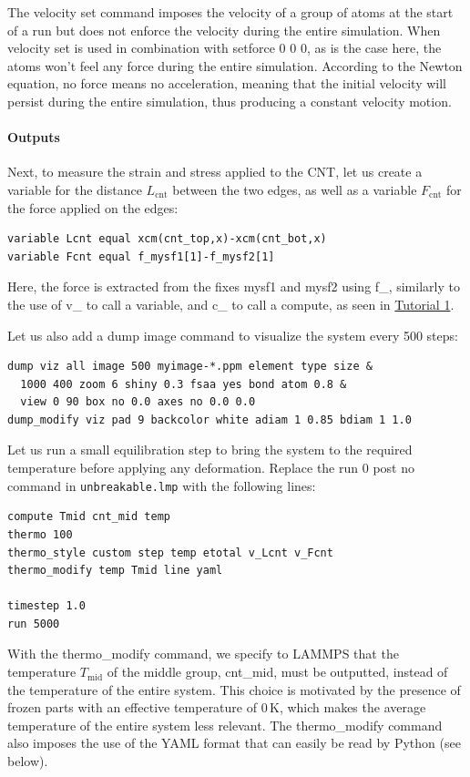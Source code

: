 \documentclass[9pt,tutorial]{livecoms}
\newcommand{\lmpcmd}[1]{\hspace{0pt}\colorbox{listing}{\textcolor{command}{\small{#1}}}\hspace{0pt}} %
\newcommand{\lmpcmdnote}[1]{\hspace{0pt}\colorbox{note_listing}{\textcolor{command}{\small{#1}}}\hspace{0pt}} %
\newcommand{\flecmd}[1]{\textcolor{command}{\texttt{#1}}} %
\begin{document}
\begin{note}
The \lmpcmdnote{velocity set}
command imposes the velocity of a group of atoms at the start of a run but does
not enforce the velocity during the entire simulation.  When \lmpcmdnote{velocity set}
is used in combination with \lmpcmdnote{setforce 0 0 0}, as is the case here, the
atoms won't feel any force during the entire simulation.  According to the Newton
equation, no force means no acceleration, meaning that the initial velocity
will persist during the entire simulation, thus producing a constant velocity motion.
\end{note}

\paragraph{Outputs}

Next, to measure the strain and stress applied to the CNT, let us create a
variable for the distance $L_\text{cnt}$ between the two edges,
as well as a variable $F_\text{cnt}$ for the force applied on the edges:
\begin{lstlisting}
variable Lcnt equal xcm(cnt_top,x)-xcm(cnt_bot,x)
variable Fcnt equal f_mysf1[1]-f_mysf2[1]
\end{lstlisting}
Here, the force is extracted from the fixes \lmpcmd{mysf1} and \lmpcmd{mysf2}
using \lmpcmd{f\_}, similarly to the use of \lmpcmd{v\_} to call a variable,
and \lmpcmd{c\_} to call a compute, as seen in \hyperref[lennard-jones-label]{Tutorial 1}.

Let us also add a \lmpcmd{dump image} command to visualize the system
every 500 steps:
\begin{lstlisting}
dump viz all image 500 myimage-*.ppm element type size &
  1000 400 zoom 6 shiny 0.3 fsaa yes bond atom 0.8 &
  view 0 90 box no 0.0 axes no 0.0 0.0
dump_modify viz pad 9 backcolor white adiam 1 0.85 bdiam 1 1.0
\end{lstlisting}
Let us run a small equilibration step to bring the system to the required
temperature before applying any deformation.  Replace the \lmpcmd{run 0 post no}
command in \flecmd{unbreakable.lmp} with the following lines:
\begin{lstlisting}
compute Tmid cnt_mid temp
thermo 100
thermo_style custom step temp etotal v_Lcnt v_Fcnt
thermo_modify temp Tmid line yaml

timestep 1.0
run 5000
\end{lstlisting}
With the \lmpcmd{thermo\_modify} command, we specify to LAMMPS that the
temperature $T_\mathrm{mid}$ of the middle group, \lmpcmd{cnt\_mid},
must be outputted, instead of the temperature of the entire system.
This choice is motivated by the presence of
frozen parts with an effective temperature of 0\,K, which makes the average
temperature of the entire system less relevant.  The \lmpcmd{thermo\_modify}
command also imposes the use of the YAML format that can easily be read by
Python (see below).
\end{document}
